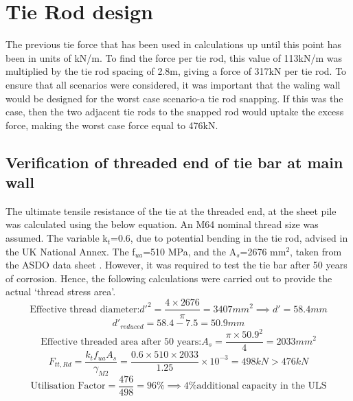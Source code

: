 \documentclass[12pt, a4paper]{article}
\begin{document}
\section{Tie Rod design}
\begin{justify}
The previous tie force that has been used in calculations up until this point has been in units of kN/m. To find the force per tie rod, this value of 113kN/m was multiplied by the tie rod spacing of 2.8m, giving a force of 317kN per tie rod. To ensure that all scenarios were considered, it was important that the waling wall would be designed for the worst case scenario-a tie rod snapping. If this was the case, then the two adjacent tie rods to the snapped rod would uptake the excess force, making the worst case force equal to 476kN. 
\end{justify}
\subsection{Verification of threaded end of tie bar at main wall}
The ultimate tensile resistance of the tie at the threaded end, at the sheet pile was calculated using the below equation. An M64 nominal thread size was assumed. The variable k$_t$=0.6, due to potential bending in the tie rod, advised in the UK National Annex. The f$_{ua}$=510 MPa, and the A$_s$=2676 mm$^2$, taken from the ASDO data sheet \cite{g}. However, it was required to test the tie bar after 50 years of corrosion. Hence, the following calculations were carried out to provide the actual `thread stress area'.
\begin{equation}
    \text{Effective thread diameter:}d'^2=\frac{4\times2676}{\pi}=3407mm^2 \implies d'=58.4mm
\end{equation}
\begin{equation}
d'_{reduced}=58.4-7.5=50.9mm
\end{equation}
\begin{equation}
    \text{Effective threaded area after 50 years:}A_s=\frac{\pi \times50.9^2}{4}=2033mm^2
\end{equation}
\begin{equation}
    F_{tt,Rd}=\frac{k_tf_{ua}A_s}{\gamma_{M2}}=\frac{0.6\times510\times2033}{1.25}\times10^{-3}=498kN>476kN
\end{equation}
\begin{equation}
    \text{Utilisation Factor}=\frac{476}{498}=96\%\implies\text{4\% additional capacity in the ULS}
\end{equation}
\end{document}
